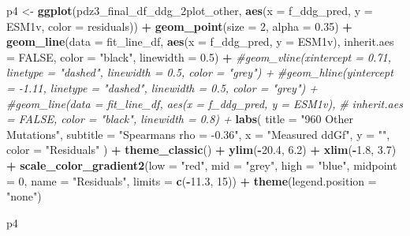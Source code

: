 \documentclass[
]{article}
\newenvironment{Shaded}{\begin{snugshade}}{\end{snugshade}}
\newcommand{\AttributeTok}[1]{\textcolor[rgb]{0.13,0.29,0.53}{#1}}
\newcommand{\CommentTok}[1]{\textcolor[rgb]{0.56,0.35,0.01}{\textit{#1}}}
\newcommand{\ConstantTok}[1]{\textcolor[rgb]{0.56,0.35,0.01}{#1}}
\newcommand{\DecValTok}[1]{\textcolor[rgb]{0.00,0.00,0.81}{#1}}
\newcommand{\FloatTok}[1]{\textcolor[rgb]{0.00,0.00,0.81}{#1}}
\newcommand{\FunctionTok}[1]{\textcolor[rgb]{0.13,0.29,0.53}{\textbf{#1}}}
\newcommand{\NormalTok}[1]{#1}
\newcommand{\OtherTok}[1]{\textcolor[rgb]{0.56,0.35,0.01}{#1}}
\newcommand{\SpecialCharTok}[1]{\textcolor[rgb]{0.81,0.36,0.00}{\textbf{#1}}}
\newcommand{\StringTok}[1]{\textcolor[rgb]{0.31,0.60,0.02}{#1}}
\begin{document}
\begin{Shaded}
\begin{Highlighting}[]
\NormalTok{p4 }\OtherTok{\textless{}{-}} \FunctionTok{ggplot}\NormalTok{(pdz3\_final\_df\_ddg\_2plot\_other, }\FunctionTok{aes}\NormalTok{(}\AttributeTok{x =}\NormalTok{ f\_ddg\_pred, }\AttributeTok{y =}\NormalTok{ ESM1v, }\AttributeTok{color =}\NormalTok{ residuals)) }\SpecialCharTok{+}
  \FunctionTok{geom\_point}\NormalTok{(}\AttributeTok{size =} \DecValTok{2}\NormalTok{, }\AttributeTok{alpha =} \FloatTok{0.35}\NormalTok{) }\SpecialCharTok{+}
  \FunctionTok{geom\_line}\NormalTok{(}\AttributeTok{data =}\NormalTok{ fit\_line\_df, }\FunctionTok{aes}\NormalTok{(}\AttributeTok{x =}\NormalTok{ f\_ddg\_pred, }\AttributeTok{y =}\NormalTok{ ESM1v),}
            \AttributeTok{inherit.aes =} \ConstantTok{FALSE}\NormalTok{, }\AttributeTok{color =} \StringTok{"black"}\NormalTok{, }\AttributeTok{linewidth =} \FloatTok{0.5}\NormalTok{) }\SpecialCharTok{+}
  \CommentTok{\#geom\_vline(xintercept = 0.71, linetype = "dashed", linewidth = 0.5, color = "grey") +}
  \CommentTok{\#geom\_hline(yintercept = {-}1.11, linetype = "dashed", linewidth = 0.5, color = "grey") +}
  \CommentTok{\#geom\_line(data = fit\_line\_df, aes(x = f\_ddg\_pred, y = ESM1v),}
  \CommentTok{\#          inherit.aes = FALSE, color = "black", linewidth = 0.8) +}
  \FunctionTok{labs}\NormalTok{(}
    \AttributeTok{title =} \StringTok{"960 Other Mutations"}\NormalTok{,}
    \AttributeTok{subtitle =} \StringTok{"Spearman\textquotesingle{}s rho = {-}0.36"}\NormalTok{,}
    \AttributeTok{x =} \StringTok{"Measured ddGf"}\NormalTok{,}
    \AttributeTok{y =} \StringTok{""}\NormalTok{,}
    \AttributeTok{color =} \StringTok{"Residuals"}
\NormalTok{  ) }\SpecialCharTok{+}
  \FunctionTok{theme\_classic}\NormalTok{() }\SpecialCharTok{+}
  \FunctionTok{ylim}\NormalTok{(}\SpecialCharTok{{-}}\FloatTok{20.4}\NormalTok{, }\FloatTok{6.2}\NormalTok{) }\SpecialCharTok{+} \FunctionTok{xlim}\NormalTok{(}\SpecialCharTok{{-}}\FloatTok{1.8}\NormalTok{, }\FloatTok{3.7}\NormalTok{) }\SpecialCharTok{+}
  \FunctionTok{scale\_color\_gradient2}\NormalTok{(}\AttributeTok{low =} \StringTok{"red"}\NormalTok{, }\AttributeTok{mid =} \StringTok{"grey"}\NormalTok{, }\AttributeTok{high =} \StringTok{"blue"}\NormalTok{, }\AttributeTok{midpoint =} \DecValTok{0}\NormalTok{, }\AttributeTok{name =} \StringTok{"Residuals"}\NormalTok{,}
                         \AttributeTok{limits =} \FunctionTok{c}\NormalTok{(}\SpecialCharTok{{-}}\FloatTok{11.3}\NormalTok{, }\DecValTok{15}\NormalTok{)) }\SpecialCharTok{+}
  \FunctionTok{theme}\NormalTok{(}\AttributeTok{legend.position =} \StringTok{"none"}\NormalTok{)}

\NormalTok{p4}
\end{Highlighting}
\end{Shaded}
\end{document}
